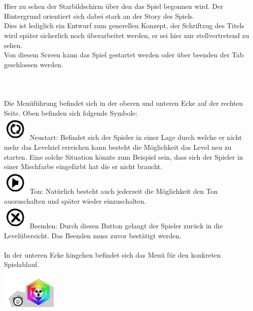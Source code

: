 \documentclass[10pt,a4paper,notitlepage]{report}
\begin{document}
	\\\\
	\Text
	Hier zu sehen der Starbildschirm über den das Spiel begonnen wird. Der Hintergrund orientiert sich dabei stark an der Story des Spiels.\\
	Dies ist lediglich ein Entwurf zum generellen Konzept, der Schriftzug des Titels wird später sicherlich noch überarbeitet werden, er sei hier nur stellvertretend zu 		sehen.\\
	Von diesem Screen kann das Spiel gestartet werden oder über beenden der Tab geschlossen werden.\\
	\clearpage\
	\\
	\\
	\\
	\Text
		Die Menüführung befindet sich in der oberen und unteren Ecke auf der rechten Seite. Oben befinden sich folgende Symbole:
	\\
	\includegraphics[width=0.09\textwidth]{png/renew.png}\ 
	 Neustart: Befindet sich der Spieler in einer Lage durch welche er nicht mehr das Levelziel erreichen 			kann besteht die Möglichkeit das Level neu zu 			starten. Eine solche Situation könnte zum Beispiel sein, dass sich der Spieler in einer Mischfarbe eingefärbt hat die er 		nicht braucht.\
	\\
	\includegraphics[width=0.09\textwidth]{png/sound.png}\ 
	 Ton: Natürlich besteht auch jederzeit die Möglichkeit den Ton auszuschalten und später wieder einzuschalten.\
	\\
	\includegraphics[width=0.09\textwidth]{png/quit.png}\ 
	 Beenden: Durch diesen Button gelangt der Spieler zurück in die Levelübersicht. Das Beenden muss zuvor bestätigt werden. \
	\\\\
	In der unteren Ecke hingehen befindet sich das Menü für den konkreten Spielablauf.
	\\
	\includegraphics[width=0.2\textwidth]{png/menu.png}\ 
\end{document}
